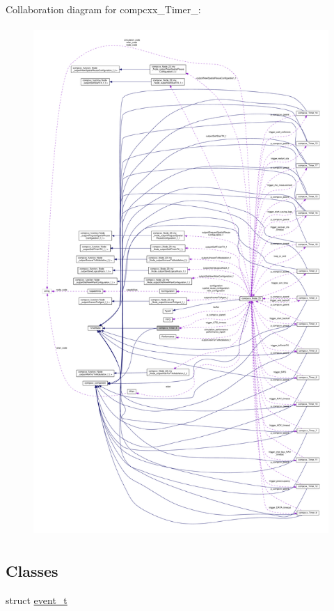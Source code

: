Collaboration diagram for compcxx\+\_\+\+Timer\+\_\+:\nopagebreak
\begin{figure}[H]
\begin{center}
\leavevmode
\includegraphics[height=550pt]{classcompcxx__Timer__8__coll__graph}
\end{center}
\end{figure}
\subsection*{Classes}
\begin{DoxyCompactItemize}
\item 
struct \hyperlink{structcompcxx__Timer__8_1_1event__t}{event\+\_\+t}
\end{DoxyCompactItemize}

